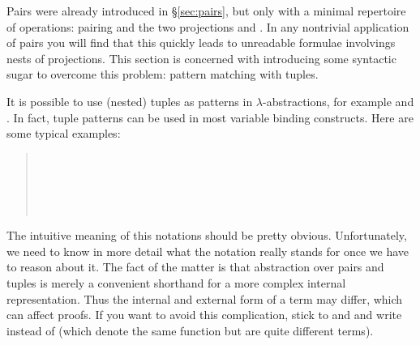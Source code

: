%
\begin{isabellebody}%
\def\isabellecontext{Pairs}%
%
%
\begin{isamarkuptext}%
\label{sec:products}
Pairs were already introduced in \S\ref{sec:pairs}, but only with a minimal
repertoire of operations: pairing and the two projections  and
. In any nontrivial application of pairs you will find that this
quickly leads to unreadable formulae involvings nests of projections. This
section is concerned with introducing some syntactic sugar to overcome this
problem: pattern matching with tuples.%
\end{isamarkuptext}%
%
%
\begin{isamarkuptext}%
It is possible to use (nested) tuples as patterns in $\lambda$-abstractions,
for example  and . In fact,
tuple patterns can be used in most variable binding constructs. Here are
some typical examples:
\begin{quote}
\\
\\
\\
\\
\end{quote}%
\end{isamarkuptext}%
%
\begin{isamarkuptext}%
The intuitive meaning of this notations should be pretty obvious.
Unfortunately, we need to know in more detail what the notation really stands
for once we have to reason about it. The fact of the matter is that abstraction
over pairs and tuples is merely a convenient shorthand for a more complex
internal representation.  Thus the internal and external form of a term may
differ, which can affect proofs. If you want to avoid this complication,
stick to  and  and write 
instead of  (which denote the same function but are quite
different terms).


\end{isamarkuptext}
\end{isabellebody}
